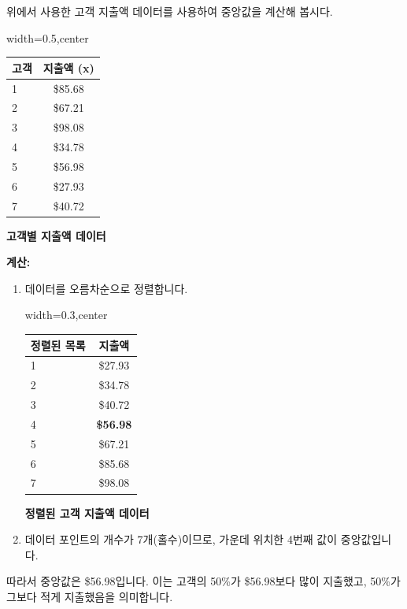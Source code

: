 \documentclass[11pt,a4paper]{book}
\providecommand{\captionof}[2]{\textbf{#2}}
\theoremstyle{definition}
\begin{document}
\begin{examplebox}[title=예시: 고객 지출액의 중앙값]
위에서 사용한 고객 지출액 데이터를 사용하여 중앙값을 계산해 봅시다.

\begin{adjustbox}{width=0.5\textwidth,center}
\begin{tabular}{lc}
\toprule
\textbf{고객} & \textbf{지출액 (x)} \\
\midrule
1 & \$85.68 \\
2 & \$67.21 \\
3 & \$98.08 \\
4 & \$34.78 \\
5 & \$56.98 \\
6 & \$27.93 \\
7 & \$40.72 \\
\bottomrule
\end{tabular}
\end{adjustbox}
\captionof{table}{고객별 지출액 데이터}
\label{tab:customer_spending_median}

\textbf{계산:}
\begin{enumerate}
    \item 데이터를 오름차순으로 정렬합니다.
    \begin{adjustbox}{width=0.3\textwidth,center}
    \begin{tabular}{lc}
    \toprule
    \textbf{정렬된 목록} & \textbf{지출액} \\
    \midrule
    1 & \$27.93 \\
    2 & \$34.78 \\
    3 & \$40.72 \\
    4 & \textbf{\$56.98} \\ %
    5 & \$67.21 \\
    6 & \$85.68 \\
    7 & \$98.08 \\
    \bottomrule
    \end{tabular}
    \end{adjustbox}
    \captionof{table}{정렬된 고객 지출액 데이터}
    \label{tab:customer_spending_ordered}
    \item 데이터 포인트의 개수가 7개(홀수)이므로, 가운데 위치한 4번째 값이 중앙값입니다.
\end{enumerate}
따라서 중앙값은 \$56.98입니다. 이는 고객의 50\%가 \$56.98보다 많이 지출했고, 50\%가 그보다 적게 지출했음을 의미합니다.
\end{examplebox}
\end{document}
